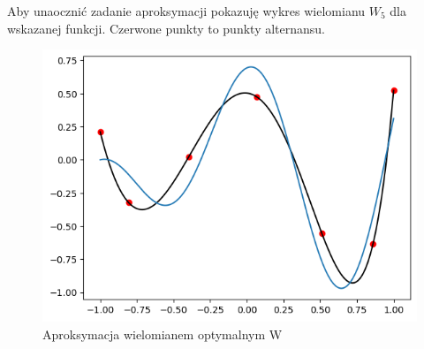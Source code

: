 \documentclass[11pt,wide]{mwart}
\begin{document}
\noindent Aby unaocznić zadanie aproksymacji pokazuję wykres wielomianu $W_5$ dla wskazanej funkcji. Czerwone punkty to punkty alternansu. \\
\begin{figure}[H]
	\begin{center}
	\includegraphics[scale=0.7]{przyklad_W}
	\end{center}
	\caption{Aproksymacja wielomianem optymalnym W}
\end{figure}
\end{document}
